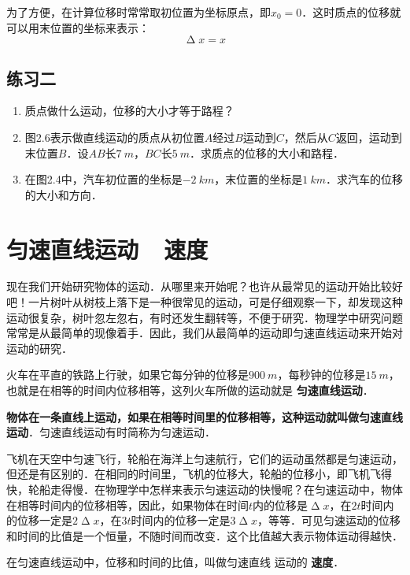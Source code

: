 为了方便，在计算位移时常常取初位置为坐标原点，即$x_0=0$．这时质点的位移就可以用末位置的坐标来表示：
\begin{equation*}
    \upDelta x=x
\end{equation*}

\subsection*{练习二}
\begin{enumerate}
    \item 质点做什么运动，位移的大小才等于路程？
    \item 图2.6表示做直线运动的质点从初位置$A$经过$B$运动到$C$，然后从$C$返回，运动到末位置$B$．设$AB$长$\qty{7}{m}$，$BC$长$\qty{5}{m}$．求质点的位移的大小和路程．
    \item 在图2.4中，汽车初位置的坐标是$\qty{-2}{km}$，末位置的坐标是$\qty{1}{km}$．求汽车的位移的大小和方向．
\end{enumerate}

\newpage

\section{匀速直线运动~~速度}
现在我们开始研究物体的运动．从哪里来开始呢？也许从最常见的运动开始比较好吧！一片树叶从树枝上落下是一种很常见的运动，可是仔细观察一下，却发现这种运动很复杂，树叶忽左忽右，有时还发生翻转等，不便于研究．物理学中研究问题常常是从最简单的现像着手．因此，我们从最简单的运动即匀速直线运动来开始对运动的研究．

火车在平直的铁路上行驶，如果它每分钟的位移是$\qty{900}{m}$，每秒钟的位移是$\qty{15}{m}$，也就是在相等的时间内位移相等，这列火车所做的运动就是\textbf{ 匀速直线运动}．

\textbf{ 物体在一条直线上运动，如果在相等时间里的位移相等，这种运动就叫做匀速直线运动}．匀速直线运动有时简称为匀速运动．

飞机在天空中匀速飞行，轮船在海洋上匀速航行，它们的运动虽然都是匀速运动，但还是有区别的．在相同的时间里，飞机的位移大，轮船的位移小，即飞机飞得快，轮船走得慢．在物理学中怎样来表示匀速运动的快慢呢？在匀速运动中，物体在相等时间内的位移相等，因此，如果物体在时间$t$内的位移是$\upDelta x$，在$2t$时间内的位移一定是$2\upDelta x$，在$3t$时间内的位移一定是$3\upDelta x$，等等．可见匀速运动的位移和时间的比值是一个恒量，不随时间而改变．这个比值越大表示物体运动得越快．

在匀速直线运动中，位移和时间的比值，叫做匀速直线
运动的\textbf{ 速度}．

